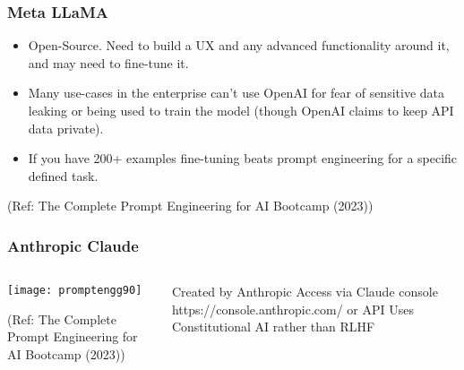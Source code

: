 \begin{frame}[fragile]\frametitle{Meta LLaMA}

\begin{itemize}
\item  Open-Source. Need to build a UX and any advanced functionality around it, and may need to fine-tune it.
\item Many use-cases in the enterprise can’t use OpenAI for fear of sensitive data leaking or being used to train the model (though OpenAI claims to keep API data private).
\item If you have 200+ examples fine-tuning beats prompt engineering for a specific defined task.
\end{itemize}	 

{\tiny (Ref: The Complete Prompt Engineering for AI Bootcamp (2023))}

\end{frame}

\begin{frame}[fragile]\frametitle{Anthropic Claude}


\begin{columns}
    \begin{column}[T]{0.6\linewidth}
		\begin{center}
		\texttt{[image: promptengg90]}

		{\tiny (Ref: The Complete Prompt Engineering for AI Bootcamp (2023))}
		\end{center}	
    \end{column}
    \begin{column}[T]{0.4\linewidth}
		Created by Anthropic 
		Access via Claude console https://console.anthropic.com/ or API
		Uses Constitutional AI rather than RLHF
    \end{column}
  \end{columns}
\end{frame}




